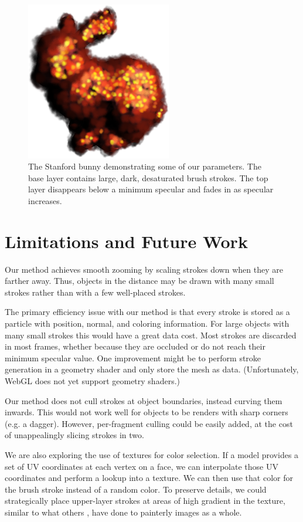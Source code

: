 \documentclass[conference]{acmsiggraph}
\begin{document}
\begin{figure}
  \centering
  \includegraphics[width=2.5in]{images/MagmaBunny}
  \caption{The Stanford bunny demonstrating some of our parameters. The base
           layer contains large, dark, desaturated brush strokes. The top layer
           disappears below a minimum specular and fades in as specular
           increases.}
\end{figure}


\section{Limitations and Future Work}

Our method achieves smooth zooming by scaling strokes down when they are
farther away. Thus, objects in the distance may be drawn with many small
strokes rather than with a few well-placed strokes.

The primary efficiency issue with our method is that every stroke is stored as
a particle with position, normal, and coloring information. For large objects
with many small strokes this would have a great data cost. Most strokes are
discarded in most frames, whether because they are occluded or do not reach
their minimum specular value. One improvement might be to perform stroke
generation in a geometry shader and only store the mesh as data.
(Unfortunately, WebGL does not yet support geometry shaders.)

Our method does not cull strokes at object boundaries, instead curving them
inwards. This would not work well for objects to be renders with sharp corners
(e.g. a dagger). However, per-fragment culling could be easily added, at the
cost of unappealingly slicing strokes in two.

We are also exploring the use of textures for color selection. If a model
provides a set of UV coordinates at each vertex on a face, we can interpolate
those UV coordinates and perform a lookup into a texture. We can then use that
color for the brush stroke instead of a random color. To preserve details, we
could strategically place upper-layer strokes at areas of high gradient in the
texture, similar to what others \cite{Hertzmann:1998:PRC:280814.280951},
\cite{Lu:2010:IPS:1730804.1730825} have done to painterly images as a whole.
\end{document}

